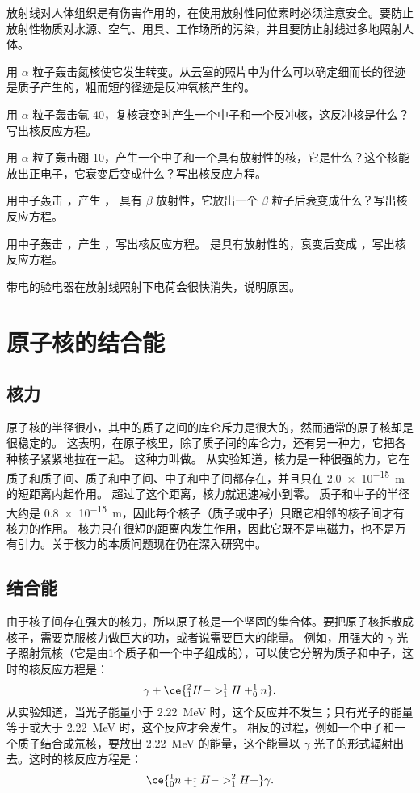 放射线对人体组织是有伤害作用的，在使用放射性同位素时必须注意安全。要防止放射性物质对水源、空气、用具、工作场所的污染，并且要防止射线过多地照射人体。

\begin{Practice}
\begin{question}
  \item 用 $\alpha$ 粒子轰击氮核使它发生转变。从云室的照片中为什么可以确定细而长的径迹是质子产生的，粗而短的径迹是反冲氧核产生的。
  \item 用 $\alpha$ 粒子轰击氩 40，复核衰变时产生一个中子和一个反冲核，这反冲核是什么？写出核反应方程。
  \item 用 $\alpha$ 粒子轰击硼 10，产生一个中子和一个具有放射性的核，它是什么？这个核能放出正电子，它衰变后变成什么？写出核反应方程。
  \item 用中子轰击 ，产生 ， 具有 $\beta$ 放射性，它放出一个 $\beta$ 粒子后衰变成什么？写出核反应方程。
  \item 用中子轰击 ，产生 ，写出核反应方程。  是具有放射性的，衰变后变成 ，写出核反应方程。
  \item 带电的验电器在放射线照射下电荷会很快消失，说明原因。
\end{question}
\end{Practice}

\section{原子核的结合能}
\subsection{核力} 
原子核的半径很小，其中的质子之间的库仑斥力是很大的，然而通常的原子核却是很稳定的。
这表明，在原子核里，除了质子间的库仑力，还有另一种力，它把各种核子紧紧地拉在一起。
这种力叫做。
从实验知道，核力是一种很强的力，它在质子和质子间、质子和中子间、中子和中子间都存在，并且只在 \qty{2.0e-15}{m} 的短距离内起作用。
超过了这个距离，核力就迅速减小到零。
质子和中子的半径大约是 \qty{0.8e-15}{m}，因此每个核子（质子或中子）只跟它相邻的核子间才有核力的作用。
核力只在很短的距离内发生作用，因此它既不是电磁力，也不是万有引力。关于核力的本质问题现在仍在深入研究中。

\subsection{结合能}
由于核子间存在强大的核力，所以原子核是一个坚固的集合体。要把原子核拆散成核子，需要克服核力做巨大的功，或者说需要巨大的能量。
例如，用强大的 $\gamma$ 光子照射氘核（它是由1个质子和一个中子组成的），可以使它分解为质子和中子，这时的核反应方程是：
\[ \gamma + \ce{ ^2_1H -> ^1_1H + ^1_0n}.\]
从实验知道，当光子能量小于 \qty{2.22}{MeV} 时，这个反应并不发生；只有光子的能量等于或大于 \qty{2.22}{MeV} 时，这个反应才会发生。
相反的过程，例如一个中子和一个质子结合成氘核，要放出 \qty{2.22}{MeV} 的能量，这个能量以 $\gamma$ 光子的形式辐射出去。这时的核反应方程是：
\[\ce{ ^1_0n + ^1_1H -> ^2_1H + }\gamma.\]

